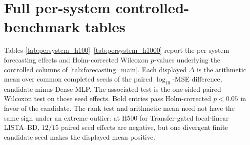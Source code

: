 \section{Full per-system controlled-benchmark tables}
\label{app:controlled_results}

Tables \ref{tab:persystem_h100}--\ref{tab:persystem_h1000} report the per-system forecasting effects and Holm-corrected Wilcoxon \(p\)-values underlying the controlled columns of \cref{tab:forecasting_main}. Each displayed \(\Delta\) is the arithmetic mean over common completed seeds of the paired \(\log_{10}\)-MSE difference, candidate minus Dense MLP. The associated test is the one-sided paired Wilcoxon test on those seed effects. Bold entries pass Holm-corrected \(p<0.05\) in favor of the candidate. The rank test and arithmetic mean need not have the same sign under an extreme outlier: at H500 for Transfer-gated local-linear LISTA--BD, \(12/15\) paired seed effects are negative, but one divergent finite candidate seed makes the displayed mean positive.

\begin{table}[tbp]
\centering
\caption{Per-system forecasting effects at \(H=100\) on the \(15\)-system controlled benchmark. \(\Delta\) is the arithmetic mean paired \(\log_{10}\)-MSE difference over common seeds (candidate minus Dense MLP), not a median; \(p_{\rm H}\) is the one-sided paired Wilcoxon \(p\)-value Holm-corrected across retained systems within each candidate column.}
\label{tab:persystem_h100}
\setlength{\tabcolsep}{3pt}
\resizebox{\textwidth}{!}{}
\end{table}

\begin{table}[tbp]
\centering
\caption{Per-system forecasting effects at \(H=500\). Effect and test definitions match \cref{tab:persystem_h100}.}
\label{tab:persystem_h500}
\setlength{\tabcolsep}{3pt}
\resizebox{\textwidth}{!}{}
\end{table}

\begin{table}[tbp]
\centering
\caption{Per-system forecasting effects at \(H=1000\). Effect and test definitions match \cref{tab:persystem_h100}.}
\label{tab:persystem_h1000}
\setlength{\tabcolsep}{3pt}
\resizebox{\textwidth}{!}{}
\end{table}

